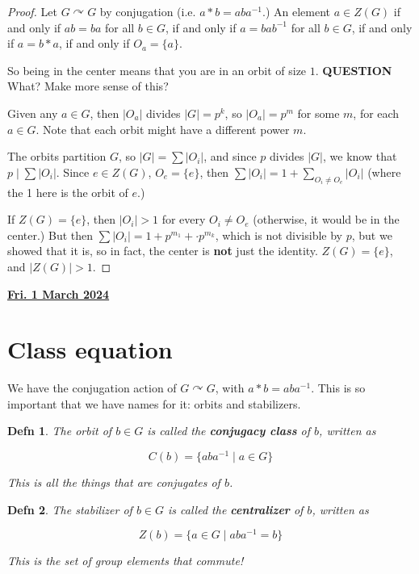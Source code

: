 \documentclass[12pt]{article}
\renewcommand{\date}[1]{\underline{\bf #1}}
\def\acts{\curvearrowright} %
\def\QUESTION{\color{red}\textbf{QUESTION}\color{black}\,}
\newtheorem{definition}{Defn}
\theoremstyle{remark}
\theoremstyle{remark}
\theoremstyle{remark}
\theoremstyle{remark}
\theoremstyle{remark}
\begin{document}
\begin{proof}
  Let $G \acts G$ by conjugation (i.e. $a * b = a b a^{-1}$.) An
  element $a \in Z(G)$ if and only if $ab = ba$ for all $b \in G$, if and only if
  $a = b ab^{-1}$ for all $b \in G$, if and only if $a = b * a$, if and only if
  $O_a = \{a\}$.

  So being in the center means that you are in an orbit of size
  $1$. \QUESTION{} What? Make more sense of this?

  Given any $a \in G$, then $|O_a|$ divides $|G| = p^k$, so $|O_a| = p^m$ for some
  $m$, for each $a \in G$. Note that each orbit might have a different power $m$.

  The orbits partition $G$, so $|G| = \sum|O_i|$, and since $p$ divides $|G|$, we
  know that $p \mid \sum|O_i|$. Since $e \in Z(G)$, $O_e = \{e\}$, then $\sum
  |O_i| = 1 + \sum_{O_i \ne O_e} |O_i|$ (where the 1 here is the orbit of $e$.)

  If $Z(G) = \{e\}$, then $|O_i| > 1$ for every $O_i \ne O_e$ (otherwise, it would
  be in the center.) But then $\sum |O_i| = 1 + p^{m_1} + \cdot p^{m_k}$, which is
  not divisible by $p$, but we showed that it is, so in fact, the center is {\bf
  not} just the identity. $Z(G) = \{e\}$, and $|Z(G)| > 1$.
\end{proof}

\date{Fri. 1 March 2024}

\section{Class equation}

We have the conjugation action of $G \acts G$, with $a * b = a b a^{-1}$. This
is so important that we have names for it: orbits and stabilizers.

\begin{definition}
  The orbit of $b \in G$ is called the {\bf conjugacy class} of $b$, written as

  \[
    C(b) = \{ aba^{-1} \mid a \in G \}
  \]

  This is all the things that are conjugates of $b$.
\end{definition}

\begin{definition}
  The stabilizer of $b \in G$ is called the {\bf centralizer} of $b$, written as

  \[
    Z(b) = \{a \in G \mid aba^{-1} = b \}
  \]

  This is the set of group elements that commute!
\end{definition}
\end{document}
